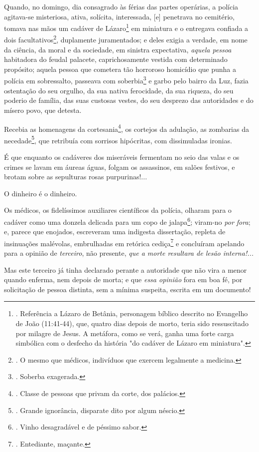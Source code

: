 Quando, no domingo, dia consagrado às férias das partes operárias, a
polícia agitava-se misteriosa, ativa, solícita, interessada, {[}e{]}
penetrava no cemitério, tomava nas mãos um cadáver de Lázaro\footnote{.
  Referência a Lázaro de Betânia, personagem bíblico descrito no
  Evangelho de João (11:41-44), que, quatro dias depois de morto, teria
  sido ressuscitado por milagre de Jesus. A metáfora, como se verá,
  ganha uma forte carga simbólica com o desfecho da história "do cadáver
  de Lázaro em miniatura".} em miniatura e o entregava confiada a dois
facultativos\footnote{. O mesmo que médicos, indivíduos que exercem
  legalmente a medicina.}, duplamente juramentados; e deles exigia a
verdade, em nome da ciência, da moral e da sociedade, em sinistra
expectativa, \emph{aquela pessoa} habitadora do feudal palacete,
caprichosamente vestida com determinado propósito; aquela pessoa que
cometera tão horroroso homicídio que punha a polícia em sobressalto,
passeava com soberbia\footnote{. Soberba exagerada.} e garbo pelo bairro
da Luz, fazia ostentação do seu orgulho, da sua nativa ferocidade, da
sua riqueza, do seu poderio de família, das suas custosas vestes, do seu
desprezo das autoridades e do mísero povo, que detesta.

Recebia as homenagens da cortesania\footnote{. Classe de pessoas que
  privam da corte, dos palácios.}, os cortejos da adulação, as zombarias
da necedade\footnote{. Grande ignorância, disparate dito por algum
  néscio.}, que retribuía com sorrisos hipócritas, com dissimuladas
ironias.

É que enquanto os cadáveres dos miseráveis fermentam no seio das valas e
os crimes se lavam em áureas águas, folgam os assassinos, em salões
festivos, e brotam sobre as sepulturas rosas purpurinas!...

O dinheiro é o dinheiro.

Os médicos, os fidelíssimos auxiliares científicos da polícia, olharam
para o cadáver como uma donzela delicada para um copo de
jalapa\footnote{. Vinho desagradável e de péssimo sabor.}; viram-no
\emph{por fora}; e, parece que enojados, escreveram uma indigesta
dissertação, repleta de insinuações malévolas, embrulhadas em retórica
cediça\footnote{. Entediante, maçante.} e concluíram apelando para a
opinião de \emph{terceiro}, não presente, \emph{que a morte resultara de
lesão interna!...}

Mas este terceiro já tinha declarado perante a autoridade que não vira a
menor quando enferma, nem depois de morta; e que \emph{essa opinião}
fora em boa fé, por solicitação de pessoa distinta, sem a mínima
suspeita, escrita em um documento!

